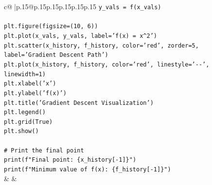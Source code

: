 \documentclass{article}
\begin{document}
{\begin{supertabular}{c@{$\;$}|p{.15\linewidth}@{}p{.15\linewidth}p{.15\linewidth}p{.15\linewidth}p{.15\linewidth}p{.15\linewidth}}
{{{\texttt{y\_vals = f(x\_vals)} \\
\\ 
\texttt{plt.figure(figsize=(10, 6))} \\
\texttt{plt.plot(x\_vals, y\_vals, label='f(x) = x\^{}2')} \\
\texttt{plt.scatter(x\_history, f\_history, color='red', zorder=5, label='Gradient Descent Path')} \\
\texttt{plt.plot(x\_history, f\_history, color='red', linestyle='{-}{-}', linewidth=1)} \\
\texttt{plt.xlabel('x')} \\
\texttt{plt.ylabel('f(x)')} \\
\texttt{plt.title('Gradient Descent Visualization')} \\
\texttt{plt.legend()} \\
\texttt{plt.grid(True)} \\
\texttt{plt.show()} \\
\\ 
\texttt{\# Print the final point} \\
\texttt{print(f"Final point: \{x\_history{[}{-}1{]}\}")} \\
\texttt{print(f"Minimum value of f(x): \{f\_history{[}{-}1{]}\}")} \\
            }
        }
    }
    & & \\ \\


\end{supertabular}}
\end{document}
